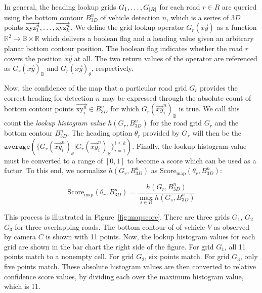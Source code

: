 In general, the heading lookup grids $G_1,\mathellipsis,G_{|R|}$ for each road $r \in R$ are queried using the bottom contour $B^n_{3D}$ of vehicle detection $n$, which is a series of $3D$ points $\overrightarrow{\text{xyz}^n_1},\mathellipsis,\overrightarrow{\text{xyz}^n_k}$.
We define the grid lookup operator $G_r(\overrightarrow{xy})$ as a function $\mathbb{R}^2 \rightarrow \mathbb{B} \times \mathbb{R}$ which delivers a boolean flag and a heading value given an arbitrary planar bottom contour position.
The boolean flag indicates whether the road $r$ covers the position $\overrightarrow{xy}$ at all.
The two return values of the operator are referenced as $G_r(\overrightarrow{xy})_\mathbb{B}$ and $G_r(\overrightarrow{xy})_\theta$, respectively.

Now, the confidence of the map that a particular road grid $G_r$ provides the correct heading for detection $n$ may be expressed through the absolute count of bottom contour points $\overrightarrow{\text{xy}^n_i} \in B^n_{3D}$ for which $G_r(\overrightarrow{xy}^n_i)_\mathbb{B}$ is true.
We call this count the \textit{lookup histogram value} $h(G_r,B^n_{3D})$ for the road grid $G_r$ and the bottom contour $B^n_{3D}$.
The heading option $\theta_r$ provided by $G_r$ will then be the $\mathtt{average}(\{G_r(\overrightarrow{xy}^n_i)_\theta|G_r(\overrightarrow{xy}^n_i)_\mathbb{B}\}_{i=1}^{i \leq k})$.
Finally, the lookup histogram value must be converted to a range of $[0,1]$ to become a score which can be used as a factor.
To this end, we normalize $h(G_r,B^n_{3D})$ as $\text{Score}_\text{map}(\theta_r, B^n_{3D})$:

\[
    \text{Score}_\text{map}(\theta_r, B^n_{3D})=\frac{h(G_r,B^n_{3D})}{\max_{s \in R} h(G_s,B^n_{3D})}
\]

This process is illustrated in Figure~\ref{fig:mapscore}.
There are three grids $G_1$, $G_2$ $G_3$ for three overlapping roads.
The bottom contour of of vehicle $V$ as observed by camera $C$ is shown with 11 points.
Now, the lookup histogram values for each grid are shown in the bar chart the right side of the figure.
For grid $G_1$, all 11 points match to a nonempty cell.
For grid $G_2$, six points match.
For grid $G_3$, only five points match.
These absolute histogram values are then converted to relative confidence score values, by dividing each over the maximum histogram value, which is 11.

